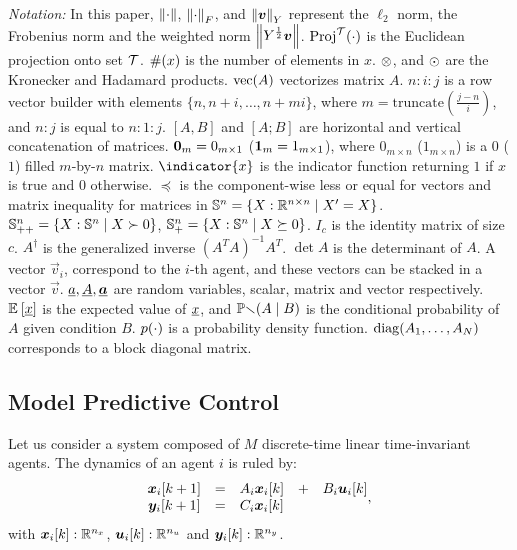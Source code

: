 \documentclass{ifacconf}  %
\begin{document}
\emph{Notation:}
In this paper, $\left\lVert\cdot\right\rVert$, $\left\lVert\cdot\right\rVert_{F}$, and $\left\lVert\boldsymbol{v}\right\rVert_{Y}$ represent the $\ell_{2}$ norm, the Frobenius norm and the weighted norm $\left\lVert Y^{\frac{1}{2}}\boldsymbol{v}\right\rVert$.
$\operatorname{Proj}^{\mathcal{T}}(\cdot)$ is the Euclidean projection onto set $\mathcal{T}$.
$\#(x)$ is the number of elements in $x$.
$\mathbin{\otimes}$, and $\odot$ are the Kronecker and Hadamard products.
$\mathrm{vec} (A)$ vectorizes matrix $A$.
${n\mathbin{:}i\mathbin{:}j}$ is a row vector builder with elements $\{n,n+i,\dots,n+mi\}$, where ${m=\mathrm{truncate}(\frac{j-n}{i})}$, and ${n\mathbin{:}j}$ is equal to ${n\mathbin{:}1\mathbin{:}j}$.
$[A,B]$ and $[A;B]$ are horizontal and vertical concatenation of matrices.
${\mathbf{0}_{m}=0_{m\times 1}}$ (${\mathbf{1}_{m}=1_{m\times 1}}$), where
$0_{m\times n}$ ($1_{m\times n}$) is a $0$ ($1$) filled \mbox{$m$-by-$n$} matrix.
$\indicator{x}$ is the indicator function returning $1$ if $x$ is true and $0$ otherwise.
$\preceq$ is the component-wise less or equal for vectors and matrix inequality for matrices in ${\mathbb{S}^{n}=\{X:\mathbb{R}^{n\times n}\mid X'=X\}}$.
${\mathbb{S}_{++}^{n}=\{X:\mathbb{S}^{n}\mid X\succ 0\}}$, ${\mathbb{S}_{+}^{n}=\{X:\mathbb{S}^{n}\mid X\succeq 0\}}$.
$I_{c}$ is the identity matrix of size $c$.
$A^{\dagger}$ is the generalized inverse ${{(A^{T}A)}^{-1}A^{T}}$.
$\det{A}$ is the determinant of $A$.
A vector $\vec{v}_{i}$, correspond to the $i$-th agent, and these vectors can be stacked in a vector $\vec{v}$.
$\underline{a},\underline{A},{\underline{\boldsymbol{a}}}$ are random variables, scalar, matrix and vector respectively.
$\mathbb{E}_{}\left[\underline{x}\right]$ is the expected value of $\underline{x}$, and $\mathbb{Pr}(A \mid B)$ is the conditional probability of $A$ given condition $B$.
$p(\cdot)$ is a probability density function. ${\operatorname{diag}(A_{1},\dots,A_{N})}$ corresponds to a block diagonal matrix.



\subsection{Model Predictive Control}\label{ssec:MPC}
Let us consider a system composed of $M$ discrete-time linear time-invariant agents.
The dynamics of an agent $i$ is ruled by:
\begin{equation}
\begin{matrix}
  \label{eq:systems}
\vec{x}_{i}[k+1]&=&A_{i}\xik &+& B_{i}\uik\\
\vec{y}_{i}[k+1]&=&C_{i}\xik &&
\end{matrix},
\end{equation}
with $\boldsymbol{x}_{i}[k]:\mathbb{R}^{n_{x}}$, $\boldsymbol{u}_{i}[k]:\mathbb{R}^{n_{u}}$ and $\boldsymbol{y}_{i}[k]:\mathbb{R}^{n_{y}}$.
\end{document}
